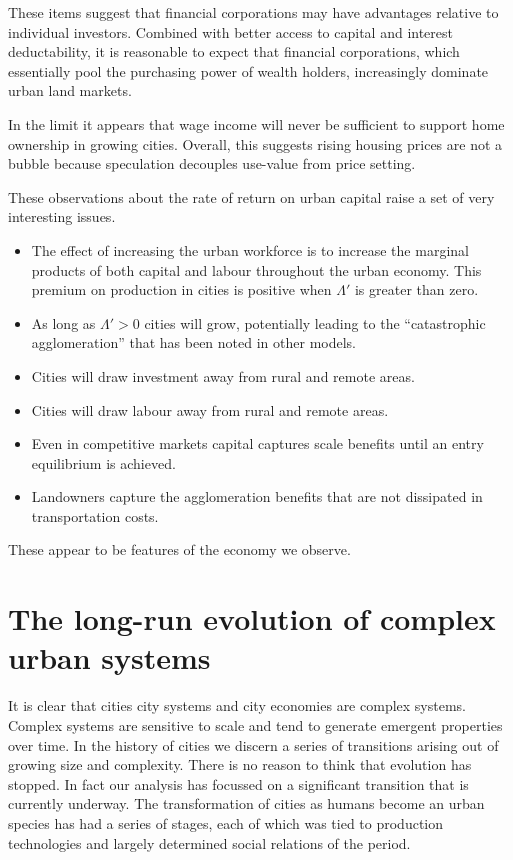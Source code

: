 These items suggest that financial corporations may have advantages relative to individual investors. Combined with better access to capital and interest deductability, it is reasonable to expect that financial corporations, which essentially pool the purchasing power of wealth holders, increasingly dominate urban land markets. %

In the limit it appears that wage income will never be sufficient to support home ownership in growing cities. 
Overall, this suggests rising housing prices are not a bubble because speculation decouples use-value from price setting. %


These observations about  the rate of return on urban capital raise a set of very interesting issues.  


\begin{itemize}
\item The effect of increasing the urban workforce is to increase the marginal products of  both capital and labour throughout the urban economy. This premium on production in cities is positive when $\Lambda'$ is greater than zero.
 \item  As long as $\Lambda'>0$ cities will  grow, potentially leading to the ``catastrophic agglomeration''  that has been noted in other models.  %
\item Cities will draw investment away from rural and remote areas.
\item Cities will draw labour away from rural and remote areas. 
\item Even in competitive markets capital captures  scale benefits until an entry equilibrium is achieved.
\item Landowners  capture the agglomeration benefits that are not dissipated in transportation costs.
\end{itemize}

These appear to be features of the economy we observe.


\section{The long-run evolution of complex urban systems}

It is clear that cities city systems and city economies are complex systems. Complex systems are sensitive to scale and tend to generate emergent properties over time. In the history of cities we discern a series of transitions arising out of growing size and complexity. There is no reason to  think that evolution has stopped. In fact our analysis has focussed on a significant transition that is currently underway. The transformation of cities as humans become an urban species has had a series of stages, each of which was tied to production technologies and largely determined social relations of the period.

